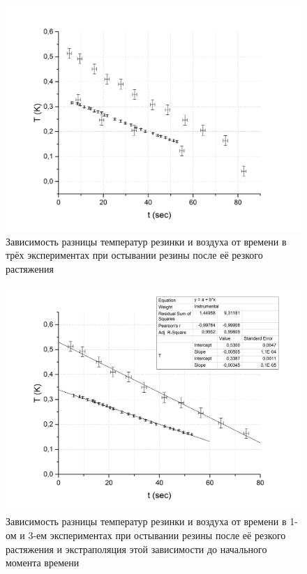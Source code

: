 \documentclass[a4paper,12pt]{article}
\newcounter{first}
\begin{document}
\setcounter{figure}{0} 

\begin{figure}[htpb!]
\centering
\includegraphics[width=150mm]{graph2_1.jpg}
\caption{Зависимость разницы температур резинки и воздуха от времени в трёх экспериментах при остывании резины после её резкого растяжения}
\end{figure}

\begin{figure}[htpb!]
\centering
\includegraphics[width=150mm]{graph2_2.jpg}
\caption{Зависимость разницы температур резинки и воздуха от времени в 1-ом и 3-ем экспериментах при остывании резины после её резкого растяжения и экстраполяция этой зависимости до начального момента времени}
\end{figure}
 
\end{document}
